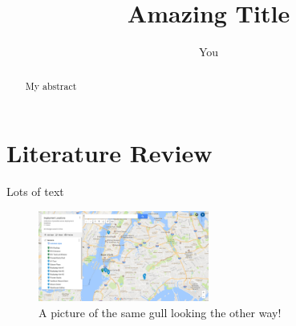 \documentclass{article}
\title{Amazing Title}
\author{You}
\begin{document}
\maketitle

\begin{abstract}
My abstract
\end{abstract}

\section{Literature Review}
Lots of text \cite{khachatryan2015precise}



\begin{figure}
  \centering
  \includegraphics[width=0.5\textwidth]{test}
  \caption{A picture of the same gull looking the other way!}
\end{figure}



\end{document}
